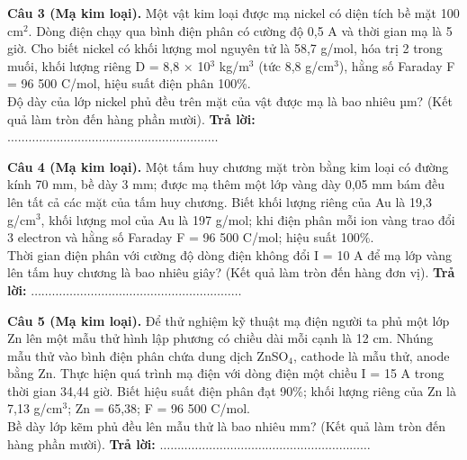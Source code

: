 \documentclass{article}
\begin{document}
\fontsize{24}{32}\selectfont
\textbf{Câu 3 (Mạ kim loại).} Một vật kim loại được mạ nickel có diện tích bề mặt 100 cm$^{\text{2}}$. Dòng điện chạy qua bình điện phân có cường độ 0,5 A và thời gian mạ là 5 giờ. Cho biết nickel có khối lượng mol nguyên tử là 58,7 g/mol, hóa trị 2 trong muối, khối lượng riêng D = 8,8 × 10$^{\text{3}}$ kg/m$^{\text{3}}$ (tức 8,8 g/cm$^{\text{3}}$), hằng số Faraday F = 96 500 C/mol, hiệu suất điện phân 100\%.\\ 
Độ dày của lớp nickel phủ đều trên mặt của vật được mạ là bao nhiêu µm? (Kết quả làm tròn đến hàng phần mười).
\vspace{12pt}
\textbf{Trả lời:} $\dots\dots\dots\dots\dots\dots\dots\dots\dots\dots\dots\dots\dots\dots\dots\dots\dots\dots\dots\dots$
\vspace*{\fill}
\newpage

\fontsize{24}{32}\selectfont
\textbf{Câu 4 (Mạ kim loại).} Một tấm huy chương mặt tròn bằng kim loại có đường kính 70 mm, bề dày 3 mm; được mạ thêm một lớp vàng dày 0,05 mm bám đều lên tất cả các mặt của tấm huy chương. Biết khối lượng riêng của Au là 19,3 g/cm$^{\text{3}}$, khối lượng mol của Au là 197 g/mol; khi điện phân mỗi ion vàng trao đổi 3 electron và hằng số Faraday F = 96 500 C/mol; hiệu suất 100\%.\\ 
Thời gian điện phân với cường độ dòng điện không đổi I = 10 A để mạ lớp vàng lên tấm huy chương là bao nhiêu giây? (Kết quả làm tròn đến hàng đơn vị).
\vspace{12pt}
\textbf{Trả lời:} $\dots\dots\dots\dots\dots\dots\dots\dots\dots\dots\dots\dots\dots\dots\dots\dots\dots\dots\dots\dots$
\vspace*{\fill}
\newpage

\fontsize{24}{32}\selectfont
\textbf{Câu 5 (Mạ kim loại).} Để thử nghiệm kỹ thuật mạ điện người ta phủ một lớp Zn lên một mẫu thử hình lập phương có chiều dài mỗi cạnh là 12 cm. Nhúng mẫu thử vào bình điện phân chứa dung dịch ZnSO$_{\text{4}}$, cathode là mẫu thử, anode bằng Zn. Thực hiện quá trình mạ điện với dòng điện một chiều I = 15 A trong thời gian 34,44 giờ. Biết hiệu suất điện phân đạt 90\%; khối lượng riêng của Zn là 7,13 g/cm$^{\text{3}}$; Zn = 65,38; F = 96 500 C/mol.\\ 
Bề dày lớp kẽm phủ đều lên mẫu thử là bao nhiêu mm? (Kết quả làm tròn đến hàng phần mười).
\vspace{12pt}
\textbf{Trả lời:} $\dots\dots\dots\dots\dots\dots\dots\dots\dots\dots\dots\dots\dots\dots\dots\dots\dots\dots\dots\dots$
\vspace*{\fill}
\newpage
\end{document}
